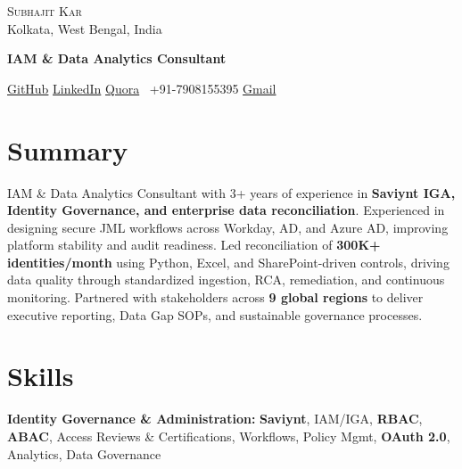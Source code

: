 \documentclass[letterpaper,10pt]{article}
\begin{document}
\begin{center}
  {\Huge \scshape \color{primary} Subhajit Kar} \\ \vspace{2pt}
  \small Kolkata, West Bengal, India \\ \vspace{4pt}

  \textbf{\Large \color{secondary} IAM \& Data Analytics Consultant} \\ \vspace{6pt}

  \small
  {\color{github}\faGithub}
  \href{https://github.com/ha4kerspidersks}{GitHub}
  \quad
  {\color{linkedin}\faLinkedin}
  \href{https://www.linkedin.com/in/subhajit-kar/}{LinkedIn}
  \quad
  {\color{quora}\faQuora}
  \href{https://www.quora.com/profile/Subhajit-Kar-18}{Quora}
  \quad
  \faPhone\ +91-7908155395
  \quad
  {\color{gmail}\faEnvelope}
  \href{mailto:karsubhajit2018@gmail.com}{Gmail}
\end{center}

\section{Summary}

IAM \& Data Analytics Consultant with 3+ years of experience in
\textbf{Saviynt IGA, Identity Governance, and enterprise data reconciliation}.
Experienced in designing secure JML workflows across Workday, AD, and Azure AD,
improving platform stability and audit readiness. Led reconciliation of
\textbf{300K+ identities/month} using Python, Excel, and SharePoint-driven controls,
driving data quality through standardized ingestion, RCA, remediation, and
continuous monitoring. Partnered with stakeholders across \textbf{9 global regions}
to deliver executive reporting, Data Gap SOPs, and sustainable governance processes.

\section{Skills}

\small

\textbf{Identity Governance \& Administration:}
\textbf{Saviynt}, IAM/IGA, \textbf{RBAC}, \textbf{ABAC},
Access Reviews \& Certifications, Workflows, Policy Mgmt,
\textbf{OAuth 2.0}, Analytics, Data Governance

\vspace{3pt}
\end{document}
